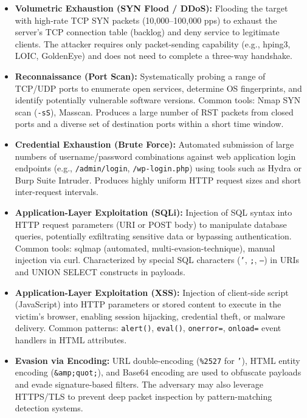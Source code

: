 \documentclass[12pt,a4paper]{report}
\begin{document}
\begin{itemize}
  \item \textbf{Volumetric Exhaustion (SYN Flood / DDoS):} Flooding the target with high-rate TCP SYN packets (10,000--100,000 pps) to exhaust the server's TCP connection table (backlog) and deny service to legitimate clients. The attacker requires only packet-sending capability (e.g., hping3, LOIC, GoldenEye) and does not need to complete a three-way handshake.
  \item \textbf{Reconnaissance (Port Scan):} Systematically probing a range of TCP/UDP ports to enumerate open services, determine OS fingerprints, and identify potentially vulnerable software versions. Common tools: Nmap SYN scan (\texttt{-sS}), Masscan. Produces a large number of RST packets from closed ports and a diverse set of destination ports within a short time window.
  \item \textbf{Credential Exhaustion (Brute Force):} Automated submission of large numbers of username/password combinations against web application login endpoints (e.g., \texttt{/admin/login}, \texttt{/wp-login.php}) using tools such as Hydra or Burp Suite Intruder. Produces highly uniform HTTP request sizes and short inter-request intervals.
  \item \textbf{Application-Layer Exploitation (SQLi):} Injection of SQL syntax into HTTP request parameters (URI or POST body) to manipulate database queries, potentially exfiltrating sensitive data or bypassing authentication. Common tools: sqlmap (automated, multi-evasion-technique), manual injection via curl. Characterized by special SQL characters (\texttt{'}, \texttt{;}, \texttt{--}) in URIs and UNION SELECT constructs in payloads.
  \item \textbf{Application-Layer Exploitation (XSS):} Injection of client-side script (JavaScript) into HTTP parameters or stored content to execute in the victim's browser, enabling session hijacking, credential theft, or malware delivery. Common patterns: \texttt{alert()}, \texttt{eval()}, \texttt{onerror=}, \texttt{onload=} event handlers in HTML attributes.
  \item \textbf{Evasion via Encoding:} URL double-encoding (\texttt{\%2527} for \texttt{'}), HTML entity encoding (\texttt{\&amp;quot;}), and Base64 encoding are used to obfuscate payloads and evade signature-based filters. The adversary may also leverage HTTPS/TLS to prevent deep packet inspection by pattern-matching detection systems.
\end{itemize}
\end{document}
